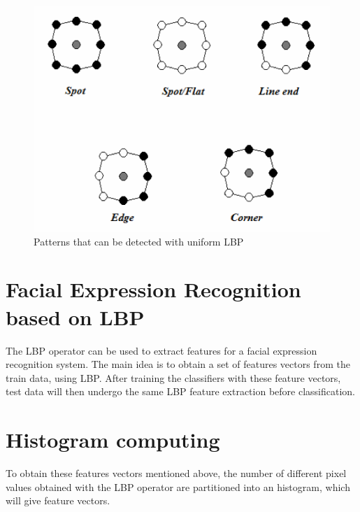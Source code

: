 \begin{figure}[!h]
\begin{center}
\noindent \includegraphics[scale=0.7]{figures/lbp_structural_features} 
\newline
\caption{Patterns that can be detected with uniform LBP}
\label{lbp_structural_features}
\end{center} 
\end{figure}

\section{Facial Expression Recognition based on LBP}

\vspace{\baselineskip}
\noindent The LBP operator can be used to extract features for a facial expression recognition system. The main idea is to obtain a set of features vectors from the train data, using LBP. After training the classifiers with these feature vectors, test data will then undergo the same LBP feature extraction before classification. 
\newline

\section{Histogram computing}

\vspace{\baselineskip}
\noindent To obtain these features vectors mentioned above, the number of different pixel values obtained with the LBP operator are partitioned into an histogram, which will give feature vectors.
\newline

